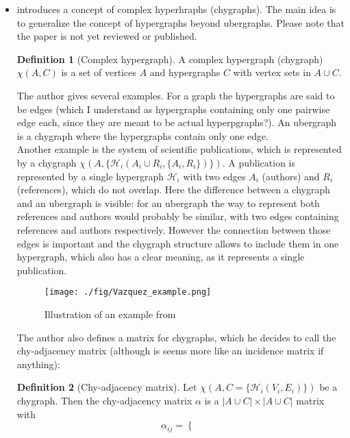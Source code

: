 \documentclass[a4paper,12pt]{article}
\theoremstyle{definition}
\newtheorem{definition}{Definition}%
\theoremstyle{remark}
\begin{document}
\begin{itemize}
\item [complex hypergraphs are equivalent to either an ubergraph or a multilayer network of two digraphs] \cite{Vazquez2022} introduces a concept of complex hyperhraphs (chygraphs). The main idea is to generalize the concept of hypergraphs beyond ubergraphs. Please note that the paper is not yet reviewed or published.
\begin{definition}[Complex hypergraph]
    A complex hypergraph (chygraph) $\chi(A,C)$ is a set of vertices $A$ and hypergraphs $C$ with vertex sets in $A \cup C$.
\end{definition}
The author gives several examples. For a graph the hypergraphs are said to be edges (which I understand as hypergraphs containing only one pairwise edge each, since they are meant to be actual hyperpgraphs?).
An ubergraph is a chygraph where the hypergraphs contain only one edge. \\
Another example is the system of scientific publications, which is represented by a chygraph $\chi(A, \{ \mathcal{H}_i(A_i \cup R_i, \{A_i, R_i\})\}) $. A publication is represented by a single hypergraph $\mathcal{H}_i$ with two edges $A_i$ (authors) and $R_i$ (references), which do not overlap. Here the difference between a chygraph and an ubergraph is visible: for an ubergraph the way to represent both references and authors would probably be similar, with two edges containing references and authors respectively. However the connection between those edges is important and the chygraph structure allows to include them in one hypergraph, which also has a clear meaning, as it represents a single publication. \\
\begin{figure}[h!]
	\begin{center}
        \texttt{[image: ./fig/Vazquez\_example.png]}
        \caption{Illustration of an example from \cite{Vazquez2022}} 
    	\label{Vazquez_example}
    \end{center}
    \end{figure}
The author also defines a matrix for chygraphs, which he decides to call the chy-adjacency matrix (although is seems more like an incidence matrix if anything):
\begin{definition}[Chy-adjacency matrix]
    Let $\chi(A, C=\{ \mathcal{H}_i(V_i, E_i)\})$ be a chygraph. Then the chy-adjacency matrix $\alpha$ is a  $|A\cup C| \times |A \cup C|$ matrix with 
    \begin{equation*}
        \alpha_{ij}=\begin{cases}

\end{cases}
\end{equation*}
\end{definition}
\end{itemize}
\end{document}
